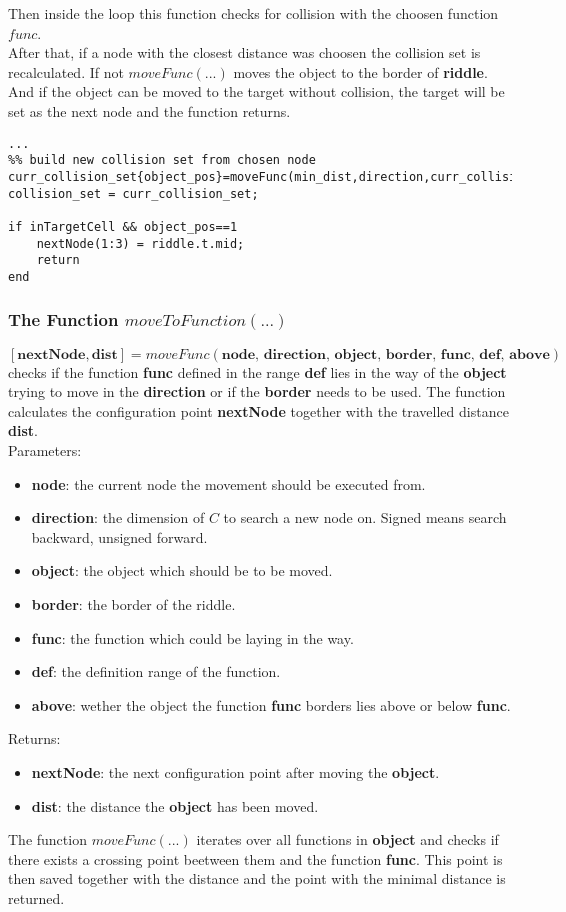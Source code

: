 Then inside the loop this function checks for collision with the choosen function $func$.\\
After that, if a node with the closest distance was choosen the collision set is recalculated. If not $moveFunc(...)$ moves the object to the border of \textbf{riddle}.
And if the object can be moved to the target without collision, the target will be set as the next node and the function returns.
\begin{lstlisting}
...
%% build new collision set from chosen node
curr_collision_set{object_pos}=moveFunc(min_dist,direction,curr_collision_set{object_pos});
collision_set = curr_collision_set;

if inTargetCell && object_pos==1
    nextNode(1:3) = riddle.t.mid;
    return
end
\end{lstlisting}

\subsubsection{The Function $moveToFunction(...)$}
$[\textbf{nextNode},\textbf{dist}]=moveFunc(\textbf{node, direction, object, border, func, def, above})$ checks if the function \textbf{func} defined in the range \textbf{def} lies in the way of the \textbf{object} trying to move in the \textbf{direction} or if the \textbf{border} needs to be used. The function calculates the configuration point \textbf{nextNode} together with the travelled distance \textbf{dist}.\\
Parameters:
\begin{itemize}
\item \textbf{node}: the current node the movement should be executed from.
\item \textbf{direction}: the dimension of $C$ to search a new node on. Signed means search backward, unsigned forward. 
\item \textbf{object}: the object which should be to be moved.
\item \textbf{border}: the border of the riddle.
\item \textbf{func}: the function which could be laying in the way.
\item \textbf{def}: the definition range of the function.
\item \textbf{above}: wether the object the function \textbf{func} borders lies above or below \textbf{func}.
\end{itemize}
Returns:
\begin{itemize}
\item \textbf{nextNode}: the next configuration point after moving the \textbf{object}.
\item \textbf{dist}: the distance the \textbf{object} has been moved.
\end{itemize}
The function $moveFunc(...)$ iterates over all functions in \textbf{object} and checks if there exists a crossing point beetween them and the function \textbf{func}.
This point is then saved together with the distance and the point with the minimal distance is returned.\\

